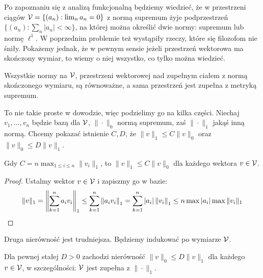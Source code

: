 Po  zapoznaniu się z analizą funkcjonalną będziemy wiedzieć, że w przestrzeni ciągów $\mathcal V = \{(a_n) : \lim_n a_n = 0\}$ z normą supremum żyje podprzestrzeń $\{(a_n) : \sum_n |a_n| < \infty\}$, na której można określić dwie normy: supremum lub normę $\ell^1$.
W poprzednim problemie też wystąpiły rzeczy, które się filozofom nie śniły.
Pokażemy jednak, że w pewnym sensie jeżeli przestrzeń wektorowa ma skończony wymiar, to wiemy o niej wszystko, co tylko można wiedzieć.

\begin{fakt}
	Wszystkie normy na $\mathcal V$, przestrzeni wektorowej nad zupełnym ciałem z normą skończonego wymiaru, są równoważne, a sama przestrzeń jest zupełna z metryką supremum.
\end{fakt}

To nie takie proste w dowodzie, więc podzielimy go na kilka części.
Niechaj $v_1, \dots, v_n$ będzie bazą dla $\mathcal V$, $\|\cdot\|_0$ normą supremum, zaś $\|\cdot\|_1$ jakąś inną normą.
Chcemy pokazać istnienie $C, D$, że $\|v\|_1 \le C \|v\|_0$ oraz $\|v\|_0 \le D \|v\|_1$.

\begin{lemat}
	Gdy $C = n \max_{1 \le i \le n} \|v_i\|_1$, to $\|v\|_1 \le C \| v \|_0$ dla każdego wektora $v \in \mathcal V$.
\end{lemat}

\begin{proof}
	Ustalmy wektor $v \in \mathcal V$ i zapiszmy go w bazie:
	\[
	\|v\|_1 = \left\| \sum_{k=1}^n a_i v_i \right\|_1 \le  \sum_{k=1}^n \left\| a_i v_i \right\|_1 =  \sum_{k=1}^n |a_i|  \left\|  v_i \right\|_1 \le n \max |a_i| \max \|v_i\|_1 \qedhere %
	\]
\end{proof}

Druga nierówność jest trudniejsza.
Będziemy indukować po wymiarze $\mathcal V$.

\begin{lemat}
	Dla pewnej stałej $D > 0$ zachodzi nierówność $\|v\|_0 \le D \|v\|_1$ dla każdego $v \in \mathcal V$, w szczególności: $\mathcal V$ jest zupełna z $\|\cdot\|_1$.
\end{lemat}

